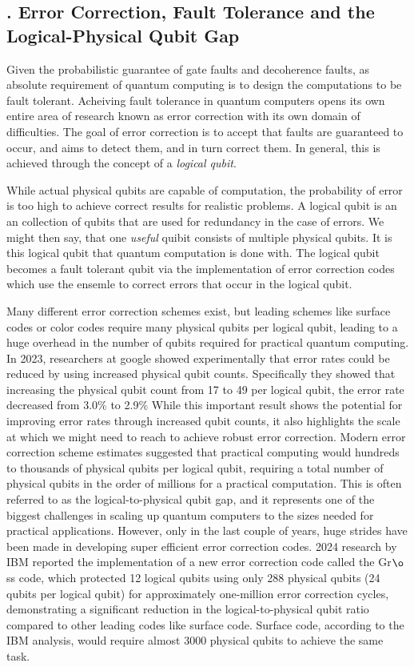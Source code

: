 \documentclass{elbioimp2}
\begin{document}
\subsection{. Error Correction, Fault Tolerance and the Logical-Physical Qubit Gap}

Given the probabilistic guarantee of gate faults and decoherence faults, as absolute requirement of quantum computing is to design the computations to be fault tolerant.
Acheiving fault tolerance in quantum computers opens its own entire area of research known as error correction with its own domain of difficulties.
The goal of error correction is to accept that faults are guaranteed to occur, and aims to detect them, and in turn correct them.
In general, this is achieved through the concept of a \textit{logical qubit}.

While actual physical qubits are capable of computation,
the probability of error is too high to achieve correct results for realistic problems. A logical qubit is an an {collection} of qubits that are used
for redundancy in the case of errors. We might then say, that one \textit{useful} quibit consists of multiple physical qubits. It is this logical qubit that quantum
computation is done with. The logical qubit becomes a fault tolerant qubit via the implementation of error correction codes which use the ensemle to correct errors that
occur in the logical qubit.

Many different error correction schemes exist, but leading schemes like surface codes or color codes require many physical qubits per logical qubit, leading to a huge overhead in the number of qubits required for practical quantum computing. In 2023, researchers at google showed experimentally that error rates could be reduced by using increased physical qubit counts\cite{https://pmc.ncbi.nlm.nih.gov/articles/PMC9946823/}. Specifically they showed that increasing the physical qubit count from 17 to 49 per logical qubit, the error rate decreased from 3.0\% to 2.9\% While this important result shows the potential for improving error rates through increased qubit counts, it also highlights the scale at which we might need to reach to achieve robust error correction. Modern error correction scheme estimates suggested that practical computing would hundreds to thousands of physical qubits per logical qubit, requiring a total number of physical qubits in the order of millions for a practical computation. This is often referred to as the logical-to-physical qubit gap, and it represents one of the biggest challenges in scaling up quantum computers to the sizes needed for practical applications. However, only in the last couple of years, huge strides have been made in developing super efficient error correction codes. 2024 research by  IBM reported the implementation of a new error correction code called the Gr$\o$ss code, which protected 12 logical qubits using only 288 physical qubits (24 qubits per logical qubit) for approximately one-million error correction cycles, demonstrating a significant reduction in the logical-to-physical qubit ratio\cite{https://www.nature.com/articles/s41586-024-07107-7} compared to other leading codes like surface code. Surface code, according to the IBM analysis, would require almost 3000 physical qubits to achieve the same task. 
\end{document}
